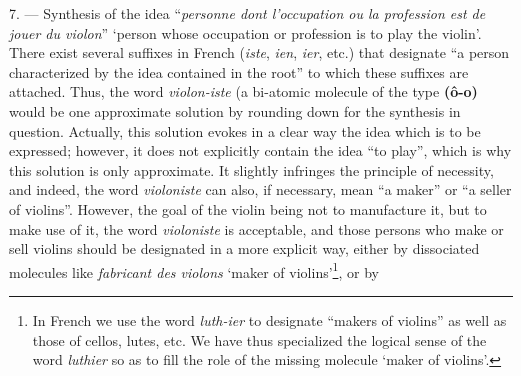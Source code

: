 \begin{sloppypar}
%
{7. --- Synthesis of the idea ``\emph{personne dont l’occupation ou la
    profession est de jouer du violon}'' `person whose occupation or
  profession is to play the violin'. There exist several suffixes in
  French (\emph{iste}, \emph{ien}, \emph{ier}, etc.) that designate
  ``a person characterized by the idea contained in the root'' to
  which these suffixes are attached. Thus, the word \emph{violon-iste}
  (a bi-atomic molecule of the type \textbf{(ô-o)} would be one
  approximate solution by rounding down for the synthesis in question.
  Actually, this solution evokes in a clear way the idea which is to
  be expressed; however, it does not explicitly contain the idea ``to
  play'', which is why this solution is only approximate. It slightly
  infringes the principle of necessity, and indeed, the word
  \emph{violoniste} can also, if necessary, mean ``a maker'' or ``a
  seller of violins''. However, the goal of the violin being not to
  manufacture it, but to make use of it, the word \emph{violoniste} is
  acceptable, and those persons who make or sell violins should be
  designated in a more explicit way, either by dissociated molecules
  like \emph{fabricant des violons} `maker of violins'\footnote{In
    French we use the word \emph{luth-ier} to designate ``makers of
    violins'' as well as those of cellos, lutes, etc. We have thus
    specialized the logical sense of the word \emph{luthier} so as to
    fill the role of the missing molecule `maker of violins'.}, or by

}
\end{sloppypar}
